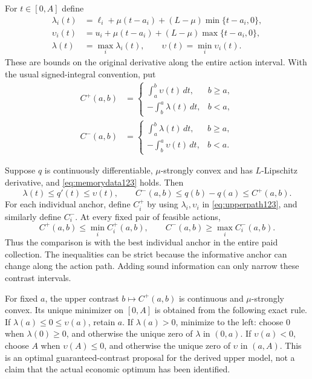 For $t\in[0,A]$ define
\begin{align}
 \lambda_i(t)
 &=\ell_i+\mu(t-a_i)+(L-\mu)\min\{t-a_i,0\},\nonumber\\
 \upsilon_i(t)
 &=u_i+\mu(t-a_i)+(L-\mu)\max\{t-a_i,0\},\label{eq:cones123}\\
 \lambda(t)&=\max_i\lambda_i(t),\qquad
 \upsilon(t)=\min_i\upsilon_i(t).\nonumber
\end{align}
These are bounds on the original derivative along the entire action
interval. With the usual signed-integral convention, put
\begin{align}
 C^+(a,b)&=
 \begin{cases}
  \int_a^b\upsilon(t)\,dt,&b\ge a,\\
  -\int_b^a\lambda(t)\,dt,&b<a,
 \end{cases}\label{eq:upperpath123}\\
 C^-(a,b)&=
 \begin{cases}
  \int_a^b\lambda(t)\,dt,&b\ge a,\\
  -\int_b^a\upsilon(t)\,dt,&b<a.
 \end{cases}\nonumber
\end{align}

\begin{theorem}
\label{thm:memorycontrast123}
Suppose $q$ is continuously differentiable, $\mu$-strongly convex and has
$L$-Lipschitz derivative, and \eqref{eq:memorydata123} holds. Then
\begin{equation}\label{eq:memoryvalid123}
 \lambda(t)\le q'(t)\le\upsilon(t),\qquad
 C^-(a,b)\le q(b)-q(a)\le C^+(a,b).
\end{equation}
For each individual anchor, define $C_i^+$ by using
$\lambda_i,\upsilon_i$ in \eqref{eq:upperpath123}, and similarly define
$C_i^-$. At every fixed pair of feasible actions,
\begin{equation}\label{eq:memorydominance123}
 C^+(a,b)\le\min_i C_i^+(a,b),\qquad
 C^-(a,b)\ge\max_i C_i^-(a,b).
\end{equation}
Thus the comparison is with the best individual anchor in the entire
paid collection. The inequalities can be strict because the informative
anchor can change along the action path. Adding sound information can
only narrow these contrast intervals.

For fixed $a$, the upper contrast $b\mapsto C^+(a,b)$ is continuous and
$\mu$-strongly convex. Its unique minimizer on $[0,A]$ is obtained from
the following exact rule. If $\lambda(a)\le0\le\upsilon(a)$, retain $a$.
If $\lambda(a)>0$, minimize to the left: choose $0$ when
$\lambda(0)\ge0$, and otherwise the unique zero of $\lambda$ in
$(0,a)$. If $\upsilon(a)<0$, choose $A$ when
$\upsilon(A)\le0$, and otherwise the unique zero of $\upsilon$ in
$(a,A)$. This is an optimal guaranteed-contrast proposal for the
derived upper model, not a claim that the actual economic optimum has
been identified.
\end{theorem}

